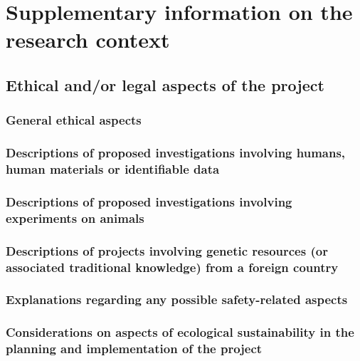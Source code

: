 \section{Supplementary information on the research context}

\subsection{Ethical and/or legal aspects of the project}

\subsubsection{General ethical aspects}

\subsubsection{Descriptions of proposed investigations involving humans, human materials or identifiable data}

\subsubsection{Descriptions of proposed investigations involving experiments on animals}

\subsubsection{Descriptions of projects involving genetic resources (or associated traditional knowledge) from a foreign country}

\subsubsection{Explanations regarding any possible safety-related aspects}



\subsubsection{Considerations on aspects of ecological sustainability in the planning and implementation of the project}

